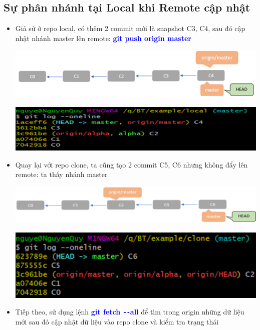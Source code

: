 \documentclass[12pt,a4paper]{report}
\begin{document}
\subsection{Sự phân nhánh tại Local khi Remote cập nhật} 
\begin{itemize}
\item Giả sử ở repo local, có thêm 2 commit mới là snapshot C3, C4, sau đó cập nhật nhánh master lên remote: \textcolor{blue}{\bf git push origin master}


 	\includegraphics[width=0.8\linewidth]{screenshot069}

 	\label{fig:screenshot069}

 	\includegraphics[width=0.8\linewidth]{screenshot070}
 
 	\label{fig:screenshot070}
\item Quay lại với repo clone, ta cũng tạo 2 commit C5, C6 nhưng không đẩy lên remote: ta thấy nhánh master 
 
 	\includegraphics[width=0.8\linewidth]{screenshot071}
 
 	\label{fig:screenshot071}
 
 	\includegraphics[width=0.8\linewidth]{screenshot072}
 
 	\label{fig:screenshot072}

\item Tiếp theo, sử dụng lệnh \textcolor{blue}{\bf git fetch \texttt{-{}-}all} để  tìm trong origin những dữ liệu mới sau đó cập nhật dữ liệu vào repo clone và kiểm tra trạng thái


\end{itemize}
\end{document}
